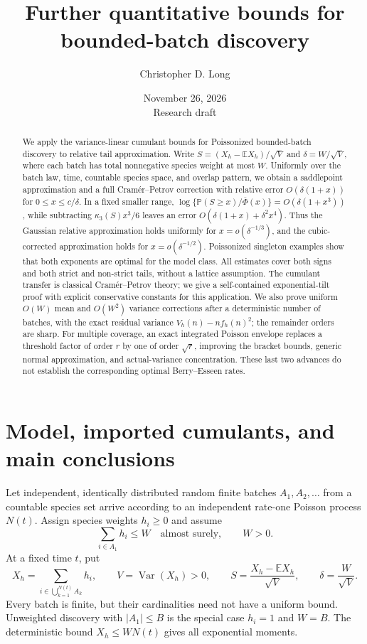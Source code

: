 \documentclass[11pt]{article}
\title{Further quantitative bounds for bounded-batch discovery}
\author{Christopher D. Long}
\date{November 26, 2026\\[3pt]\small Research draft}
\numberwithin{equation}{section}
\theoremstyle{remark}
\newcommand{\E}{\mathbb E}
\newcommand{\Pp}{\mathbb P}
\newcommand{\Var}{\operatorname{Var}}
\begin{document}
\maketitle

\begin{abstract}
We apply the variance-linear cumulant bounds for Poissonized bounded-batch
discovery to relative tail approximation. Write
$S=(X_h-\E X_h)/\sqrt V$ and $\delta=W/\sqrt V$, where each batch has total
nonnegative species weight at most $W$. Uniformly over the batch law, time,
countable species space, and overlap pattern, we obtain a saddlepoint
approximation and a full Cram\'er--Petrov correction with relative error
$O(\delta(1+x))$ for $0\le x\le c/\delta$. In a fixed smaller range,
$\log\{\Pp(S\ge x)/\overline\Phi(x)\}=O(\delta(1+x^3))$, while subtracting
$\kappa_3(S)x^3/6$ leaves an error
$O(\delta(1+x)+\delta^2x^4)$. Thus the Gaussian relative approximation holds
uniformly for $x=o(\delta^{-1/3})$, and the cubic-corrected approximation
holds for $x=o(\delta^{-1/2})$. Poissonized singleton examples show that both
exponents are optimal for the model class. All estimates cover both signs
and both strict and non-strict tails, without a lattice assumption. The
cumulant transfer is classical Cram\'er--Petrov theory; we give a
self-contained exponential-tilt proof with explicit conservative constants
for this application. We also prove uniform $O(W)$ mean and $O(W^2)$
variance corrections after a deterministic number of batches, with the
exact residual variance $V_h(n)-nf_h(n)^2$; the remainder orders are sharp.
For multiple coverage, an exact integrated Poisson envelope replaces a
threshold factor of order $r$ by one of order $\sqrt r$, improving the
bracket bounds, generic normal approximation, and actual-variance
concentration. These last two advances do not establish the corresponding
optimal Berry--Esseen rates.
\end{abstract}

\section{Model, imported cumulants, and main conclusions}\label{sec:main}

Let independent, identically distributed random finite batches $A_1,A_2,\ldots$ from a countable
species set arrive according to an independent rate-one Poisson process
$N(t)$. Assign species weights $h_i\ge0$ and assume
\begin{equation}\label{eq:batchweight}
 \sum_{i\in A_1}h_i\le W\quad\text{almost surely},\qquad W>0.
\end{equation}
At a fixed time $t$, put
\[
 X_h=\sum_{i\in\bigcup_{k=1}^{N(t)}A_k}h_i,
 \qquad V=\Var(X_h)>0,
 \qquad S=\frac{X_h-\E X_h}{\sqrt V},
 \qquad \delta=\frac W{\sqrt V}.
\]
Every batch is finite, but their cardinalities need not have a uniform bound.
Unweighted discovery with $|A_1|\le B$ is the special case $h_i=1$ and $W=B$.
The deterministic bound $X_h\le WN(t)$ gives all exponential moments.
\end{document}
